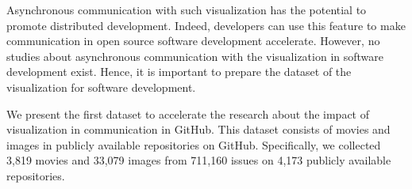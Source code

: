 Asynchronous communication with 
such visualization
has the potential 
to promote distributed development. 
Indeed, developers can use this feature to make communication 
in open source software development accelerate. 
However, no studies about asynchronous communication with 
the visualization in software development exist.
Hence, it is important to prepare the dataset of the visualization
for software development. 


We present the first dataset to accelerate the research about 
the impact of visualization in communication in GitHub. 
This dataset consists of movies and images 
in publicly available repositories on GitHub. 
Specifically, we collected 
3,819 movies and 
33,079 images from 
711,160 issues on
4,173 publicly available repositories.
